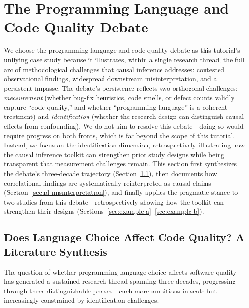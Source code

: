 \section{The Programming Language and Code Quality Debate}
\label{sec:pl-debate}

We choose the programming language and code quality debate as this tutorial's unifying case study because it illustrates, within a single research thread, the full arc of methodological challenges that causal inference addresses: contested observational findings, widespread downstream misinterpretation, and a persistent impasse.
The debate's persistence reflects two orthogonal challenges: \emph{measurement} (whether bug-fix heuristics, code smells, or defect counts validly capture ``code quality,'' and whether ``programming language'' is a coherent treatment) and \emph{identification} (whether the research design can distinguish causal effects from confounding).
We do not aim to resolve this debate---doing so would require progress on both fronts, which is far beyond the scope of this tutorial.
Instead, we focus on the identification dimension, retrospectively illustrating how the causal inference toolkit can strengthen prior study designs while being transparent that measurement challenges remain.
This section first synthesizes the debate's three-decade trajectory (Section~\ref{sec:pl-lit-synthesis}), then documents how correlational findings are systematically reinterpreted as causal claims (Section~\ref{sec:pl-misinterpretation}), and finally applies the pragmatic stance to two studies from this debate---retrospectively showing how the toolkit can strengthen their designs (Sections~\ref{sec:example-a}--\ref{sec:example-b}).

\subsection{Does Language Choice Affect Code Quality? A Literature Synthesis}
\label{sec:pl-lit-synthesis}

The question of whether programming language choice affects software quality has generated a sustained research thread spanning three decades, progressing through three distinguishable phases---each more ambitious in scale but increasingly constrained by identification challenges.


